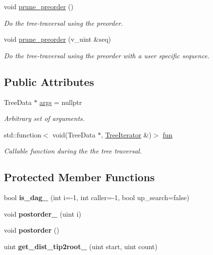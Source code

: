 \begin{DoxyCompactItemize}
void \hyperlink{classTree_ac85bfb083b3856e65987e1d15885a61c}{prune\+\_\+preorder} ()
\begin{DoxyCompactList}\small\item\em Do the tree-\/traversal using the preorder. \end{DoxyCompactList}\item 
void \hyperlink{classTree_a6841109c7ff37bcabdf3a4d79009ad21}{prune\+\_\+preorder} (v\+\_\+uint \&seq)
\begin{DoxyCompactList}\small\item\em Do the tree-\/traversal using the preorder with a user specific sequence. \end{DoxyCompactList}\end{DoxyCompactItemize}
\subsection*{Public Attributes}
\begin{DoxyCompactItemize}
\item 
\mbox{\label{classTree_a205a142291d4070468c509e2b564e06c}} 
Tree\+Data $\ast$ \hyperlink{classTree_a205a142291d4070468c509e2b564e06c}{args} = nullptr
\begin{DoxyCompactList}\small\item\em Arbitrary set of arguments. \end{DoxyCompactList}\item 
std\+::function$<$ void(Tree\+Data $\ast$, \hyperlink{classTreeIterator}{Tree\+Iterator} \&)$>$ \hyperlink{classTree_a92a3c76480465109fea154e2f2cab4ab}{fun}
\begin{DoxyCompactList}\small\item\em Callable function during the the tree traversal. \end{DoxyCompactList}\end{DoxyCompactItemize}
\subsection*{Protected Member Functions}
\begin{DoxyCompactItemize}
\item 
\mbox{\label{classTree_a4f73b72aa5a79068661593ae32cb8f57}} 
bool {\bfseries is\+\_\+dag\+\_\+} (int i=-\/1, int caller=-\/1, bool up\+\_\+search=false)
\item 
\mbox{\label{classTree_ad082d4d0c63728243e027aba5882d76e}} 
void {\bfseries postorder\+\_\+} (uint i)
\item 
\mbox{\label{classTree_a955f3ddab30616447f4d785272cfa090}} 
void {\bfseries postorder} ()
\item 
\mbox{\label{classTree_a83d01c0cde3abfcc0f09c0bf33795259}} 
uint {\bfseries get\+\_\+dist\+\_\+tip2root\+\_\+} (uint start, uint count)
\end{DoxyCompactItemize}

